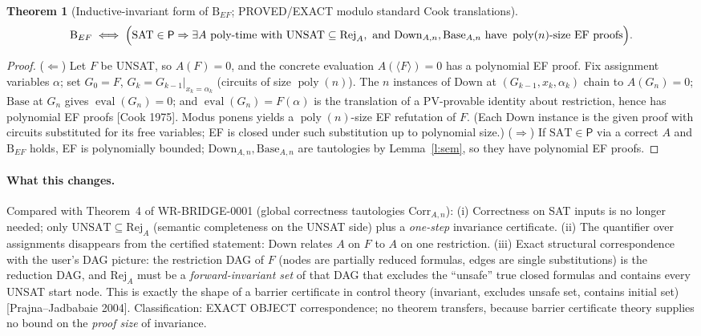 \documentclass[11pt]{article}
\newtheorem{theorem}{Theorem}
\newcommand{\SAT}{\mathrm{SAT}}
\newcommand{\Pc}{\mathsf P}
\newcommand{\poly}{\operatorname{poly}}
\newcommand{\Down}{\mathrm{Down}}
\newcommand{\Base}{\mathrm{Base}}
\begin{document}
\begin{theorem}[Inductive-invariant form of $\mathrm B_{EF}$; PROVED/EXACT
modulo standard Cook translations]\label{t:down}
\[
\mathrm B_{EF}\iff\Bigl(\SAT\in\Pc\Rightarrow\exists A\ \text{poly-time with }
\mathrm{UNSAT}\subseteq\mathrm{Rej}_A,\ \text{and }\Down_{A,n},\Base_{A,n}
\text{ have }\poly(n)\text{-size EF proofs}\Bigr).
\]
\end{theorem}
\begin{proof}
($\Leftarrow$) Let $F$ be UNSAT, so $A(F)=0$, and the concrete evaluation
$A(\langle F\rangle)=0$ has a polynomial EF proof. Fix assignment variables
$\alpha$; set $G_0=F$, $G_k=G_{k-1}|_{x_k=\alpha_k}$ (circuits of size
$\poly(n)$). The $n$ instances of $\Down$ at $(G_{k-1},x_k,\alpha_k)$ chain to
$A(G_n)=0$; $\Base$ at $G_n$ gives $\operatorname{eval}(G_n)=0$; and
$\operatorname{eval}(G_n)=F(\alpha)$ is the translation of a
$\mathrm{PV}$-provable identity about restriction, hence has polynomial EF
proofs [Cook 1975]. Modus ponens yields a $\poly(n)$-size EF refutation of
$F$. (Each $\Down$ instance is the given proof with circuits substituted
for its free variables; EF is closed under such substitution up to
polynomial size.)
($\Rightarrow$) If $\SAT\in\Pc$ via a correct $A$ and $\mathrm B_{EF}$ holds,
EF is polynomially bounded; $\Down_{A,n},\Base_{A,n}$ are tautologies by
Lemma~\ref{l:sem}, so they have polynomial EF proofs.
\end{proof}

\paragraph{What this changes.} Compared with Theorem~4 of WR-BRIDGE-0001
(global correctness tautologies $\mathrm{Corr}_{A,n}$):
(i) Correctness on SAT inputs is no longer needed; only
$\mathrm{UNSAT}\subseteq\mathrm{Rej}_A$ (semantic completeness on the UNSAT
side) plus a \emph{one-step} invariance certificate.
(ii) The quantifier over assignments disappears from the certified
statement: $\Down$ relates $A$ on $F$ to $A$ on one restriction.
(iii) Exact structural correspondence with the user's DAG picture: the
restriction DAG of $F$ (nodes are partially reduced formulas, edges are
single substitutions) is the reduction DAG, and $\mathrm{Rej}_A$ must be a
\emph{forward-invariant set} of that DAG that excludes the ``unsafe'' true
closed formulas and contains every UNSAT start node. This is exactly the
shape of a barrier certificate in control theory (invariant, excludes
unsafe set, contains initial set) [Prajna--Jadbabaie 2004]. Classification:
EXACT OBJECT correspondence; no theorem transfers, because barrier
certificate theory supplies no bound on the \emph{proof size} of invariance.
\end{document}
